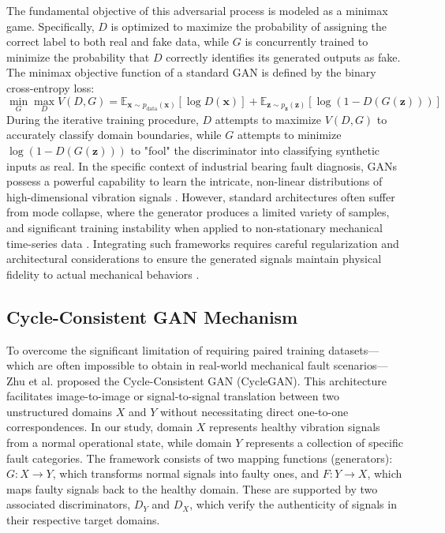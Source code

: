The fundamental objective of this adversarial process is modeled as a minimax game. Specifically, $D$ is optimized to maximize the probability of assigning the correct label to both real and fake data, while $G$ is concurrently trained to minimize the probability that $D$ correctly identifies its generated outputs as fake. The minimax objective function of a standard GAN is defined by the binary cross-entropy loss:
\begin{equation}
\min_{G} \max_{D} V(D, G) = \mathbb{E}_{\boldsymbol{x} \sim p_{\text{data}}(\boldsymbol{x})}[\log D(\boldsymbol{x})] + \mathbb{E}_{\boldsymbol{z} \sim p_{\boldsymbol{z}}(\boldsymbol{z})}[\log(1 - D(G(\boldsymbol{z})))]
\end{equation}
During the iterative training procedure, $D$ attempts to maximize $V(D, G)$ to accurately classify domain boundaries, while $G$ attempts to minimize $\log(1 - D(G(\boldsymbol{z})))$ to "fool" the discriminator into classifying synthetic inputs as real. In the specific context of industrial bearing fault diagnosis, GANs possess a powerful capability to learn the intricate, non-linear distributions of high-dimensional vibration signals \cite{radford2015dcgan}. However, standard architectures often suffer from mode collapse, where the generator produces a limited variety of samples, and significant training instability when applied to non-stationary mechanical time-series data \cite{li2021wgan_gp_fault, fan2021enhanced_gan}. Integrating such frameworks requires careful regularization and architectural considerations to ensure the generated signals maintain physical fidelity to actual mechanical behaviors \cite{liu2024gan_imbalanced_review}.

\subsection{Cycle-Consistent GAN Mechanism}
To overcome the significant limitation of requiring paired training datasets—which are often impossible to obtain in real-world mechanical fault scenarios—Zhu et al. \cite{zhu2017cyclegan} proposed the Cycle-Consistent GAN (CycleGAN). This architecture facilitates image-to-image or signal-to-signal translation between two unstructured domains $X$ and $Y$ without necessitating direct one-to-one correspondences. In our study, domain $X$ represents healthy vibration signals from a normal operational state, while domain $Y$ represents a collection of specific fault categories. The framework consists of two mapping functions (generators): $G: X \to Y$, which transforms normal signals into faulty ones, and $F: Y \to X$, which maps faulty signals back to the healthy domain. These are supported by two associated discriminators, $D_Y$ and $D_X$, which verify the authenticity of signals in their respective target domains.

